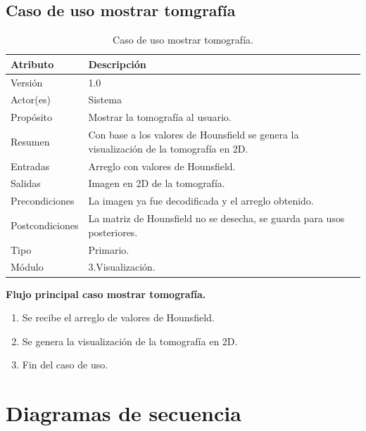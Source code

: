 \documentclass[12pt]{report}
\begin{document}
\subsection{Caso de uso mostrar tomgrafía}
\begin{table}[H]
\begin{center}
\begin{tabular}{|p{25mm}|p{60mm}|}
\hline
Atributo & Descripción\\
\hline \hline 
Versión & 1.0\\
\hline
Actor(es) & Sistema\\
\hline
Propósito & Mostrar la tomografía al usuario.\\
\hline
Resumen & Con base a los valores de Hounsfield se genera la visualización de la tomografía en 2D.\\
\hline
Entradas & Arreglo con valores de Hounsfield.\\
\hline
Salidas & Imagen en 2D de la tomografía.\\
\hline
Precondiciones & La imagen ya fue decodificada y el arreglo obtenido.\\
\hline
Postcondiciones & La matriz de Hounsfield no se desecha, se guarda para usos posteriores.\\
\hline
Tipo & Primario.\\
\hline 
Módulo & 3.Visualización.\\
\hline
\end{tabular}
\caption{Caso de uso mostrar tomografía.}
\end{center}
\end{table}

\textbf{Flujo principal caso mostrar tomografía. }
\begin{enumerate}
\item Se recibe el arreglo de valores de Hounsfield.
\item Se genera la visualización de la tomografía en 2D.
\item Fin del caso de uso.
\end{enumerate}

\section{Diagramas de secuencia}
\end{document}
